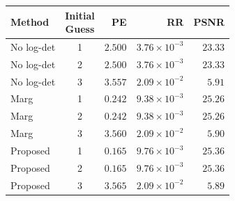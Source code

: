 \begin{tabular}{@{}lcrrr@{}}
\toprule
Method & \shortstack{\small Initial\\Guess} & PE & RR & PSNR \\
\midrule
No log-det & 1 & $2.500$ & $3.76\times10^{-3}$ & $23.33$ \\
No log-det & 2 & $2.500$ & $3.76\times10^{-3}$ & $23.33$ \\
No log-det & 3 & $3.557$ & $2.09\times10^{-2}$ & $5.91$ \\
\addlinespace[3pt]
Marg & 1 & $0.242$ & $9.38\times10^{-3}$ & $25.26$ \\
Marg & 2 & $0.242$ & $9.38\times10^{-3}$ & $25.26$ \\
Marg & 3 & $3.560$ & $2.09\times10^{-2}$ & $5.90$ \\
\addlinespace[3pt]
Proposed & 1 & $\mathbf{0.165}$ & $9.76\times10^{-3}$ & $\mathbf{25.36}$ \\
Proposed & 2 & $\mathbf{0.165}$ & $9.76\times10^{-3}$ & $\mathbf{25.36}$ \\
Proposed & 3 & $3.565$ & $2.09\times10^{-2}$ & $5.89$ \\
\bottomrule
\end{tabular}
